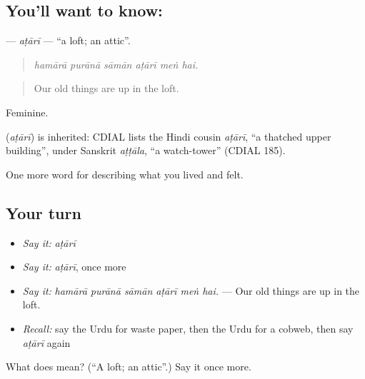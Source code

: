 \subsection*{You'll want to know: }
\textbf{} — \emph{aṭārī} — \textquotedblleft{}a loft; an attic\textquotedblright{}.

\begin{quote}
     
\end{quote}

\begin{quote}
\emph{hamārā purānā sāmān aṭārī meṅ hai.}
\end{quote}

\begin{quote}
Our old things are up in the loft.
\end{quote}

Feminine.

\begin{cousinweb}
\textbf{} (\emph{aṭārī}) is inherited: CDIAL lists the Hindi cousin \emph{aṭārī}, \textquotedblleft{}a thatched upper building\textquotedblright{}, under Sanskrit \emph{aṭṭāla}, \textquotedblleft{}a watch-tower\textquotedblright{} (CDIAL 185).
\end{cousinweb}

\begin{grammarlens}[title={What you've built}]
One more word for describing what you lived and felt.
\end{grammarlens}

\subsection*{Your turn}
\begin{itemize}
\raggedright
  \item \emph{Say it:} \emph{aṭārī}
  \item \emph{Say it:} \emph{aṭārī}, once more
  \item \emph{Say it:} \emph{hamārā purānā sāmān aṭārī meṅ hai.} — Our old things are up in the loft.
  \item \emph{Recall:} say the Urdu for waste paper, then the Urdu for a cobweb, then say \emph{aṭārī} again
\end{itemize}

\begin{tcolorbox}[breakable,colback=teal!4,colframe=teal!35!black,title={Before you move on}]
What does  mean? (\textquotedblleft{}A loft; an attic\textquotedblright{}.) Say it once more.
\end{tcolorbox}
